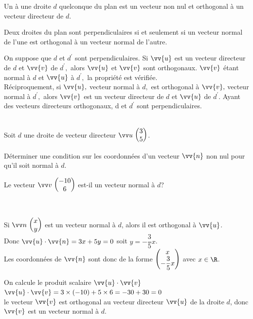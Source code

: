     \begin{bdefi}
        Un  à une droite $d$ quelconque du plan est un vecteur non nul et orthogonal à un vecteur directeur de $d$.
    \end{bdefi}
    
    \begin{bprop}
        Deux droites du plan sont perpendiculaires si et seulement si un vecteur normal de l'une est orthogonal à un vecteur normal de l'autre.
    \end{bprop}
    
    \begin{bdemo}
        On suppose que $d$ et $d^{\prime}$ sont perpendiculaires. Si $\vv{u}$ est un vecteur directeur de $d$ et $\vv{v}$ de $d^{\prime},$ alors $\vv{u}$ et $\vv{v}$ sont orthogonaux. $\vv{v}$ étant normal à $d$ et $\vv{u}$ à $d^{\prime},$ la propriété est vérifiée.\\
        Réciproquement, si $\vv{u},$ vecteur normal à $d,$ est orthogonal à $\vv{v},$ vecteur normal à $d^{\prime},$ alors $\vv{v}$ est un vecteur directeur de $d$ et $\vv{u}$ de $d^{\prime} .$ Ayant des vecteurs directeurs orthogonaux, d et $d^{\prime}$ sont perpendiculaires.
    \end{bdemo}
    
    \begin{bmethode}
        \\
        Soit $d$ une droite de vecteur directeur $\Coord{u}{3}{5}$.
        \begin{enumMet}
            \item Déterminer une condition sur les coordonnées d'un vecteur $\vv{n}$ non nul pour qu'il soit normal à $d$.
            \item Le vecteur $\Coord{v}{-10}{6}$ est-il un vecteur normal à $d$?
        \end{enumMet}
        
        \\
        \begin{enumMet}
            \item Si $\Coord{n}{x}{y}$ est un vecteur normal à $d$, alors il est orthogonal à $\vv{u}$.\\
            Donc $\vv{u} \cdot \vv{n}=3 x+5 y=0$ soit $y=-\dfrac{3}{5} x$.\\
            Les coordonnées de $\vv{n}$ sont donc de la forme $\begin{pmatrix} x\\ -\dfrac{3}{5}x \end{pmatrix}$ avec $x \in \R$.
            \item On calcule le produit scalaire $\vv{u}\cdot\vv{v}$\\
            $\vv{u}\cdot\vv{v}=3\times(-10)+5\times6=-30+30=0$\\
            le vecteur $\vv{v}$ est orthogonal au vecteur directeur $\vv{u}$ de la droite $d$, donc $\vv{v}$ est un vecteur normal à $d$. 
        \end{enumMet}
    \end{bmethode}
    

